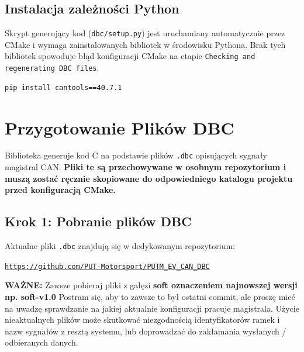 \documentclass[a4paper,11pt]{article}
\begin{document}
\subsection{Instalacja zależności Python}

Skrypt generujący kod (\texttt{dbc/setup.py}) jest uruchamiany automatycznie przez CMake i wymaga zainstalowanych bibliotek w środowisku Pythona. Brak tych bibliotek spowoduje błąd konfiguracji CMake na etapie \texttt{Checking and regenerating DBC files}.

\begin{lstlisting}[style=bashstyle, caption=Instalacja wymaganych bibliotek Python]
pip install cantools==40.7.1
\end{lstlisting}

\newpage

\section{Przygotowanie Plików DBC}

Biblioteka generuje kod C na podstawie plików \texttt{.dbc} opisujących sygnały magistral CAN. \textbf{Pliki te są przechowywane w osobnym repozytorium i muszą zostać ręcznie skopiowane do odpowiedniego katalogu projektu przed konfiguracją CMake.}

\subsection*{Krok 1: Pobranie plików DBC}

Aktualne pliki \texttt{.dbc} znajdują się w dedykowanym repozytorium:

\begin{center}
\href{https://github.com/PUT-Motorsport/PUTM_EV_CAN_DBC}{\texttt{https://github.com/PUT-Motorsport/PUTM\_EV\_CAN\_DBC}}
\end{center}

\textcolor{warningred}{\textbf{WAŻNE:}} Zawsze pobieraj pliki z gałęzi \textbf{soft oznaczeniem najnowszej wersji np. soft-v1.0} Postram się, aby to zawsze to był ostatni commit, ale proszę mieć na uwadzę sprawdzanie na jakiej aktualnie konfiguracji pracuje magistrala. Użycie nieaktualnych plików może skutkować niezgodnością identyfikatorów ramek i nazw sygnałów z resztą systemu, lub doprowadzać do zakłamania wysłanych / odbieranych danych.
\end{document}
